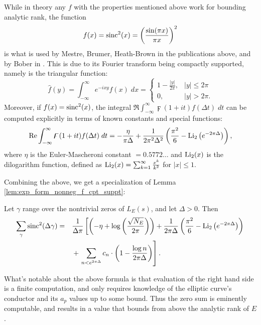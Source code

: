 While in theory any $f$ with the properties mentioned above work for bounding analytic rank, the function
\begin{equation}
f(x) = \operatorname{sinc}^2(x) = \left(\frac{\sin(\pi x)}{\pi x}\right)^2
\end{equation}
is what is used by Mestre, Brumer, Heath-Brown in the publications above, and by Bober in \cite{Bob-2011}. This is due to its Fourier transform being compactly supported, namely is the triangular function:
\begin{equation}
\hat{f}(y) = \int_{-\infty}^{\infty} e^{-i x y}f(x)\; dx =  \begin{cases} 1 - \frac{|y|}{2\pi}, & |y|\le 2\pi \\ 0, & |y| > 2\pi.\end{cases}
\end{equation}
Moreover, if $f(x) = \operatorname{sinc}^2(x)$, the integral $\Re\int_{-\infty}^{\infty} \digamma(1+it)f(\Delta t) \; dt$ can be computed explicitly in terms of known constants and special functions:
\begin{equation}
\mbox{\rm Re}\int_{-\infty}^{\infty} \digamma(1+it)f(\Delta t) \; dt = - \frac{\eta}{\pi \Delta} + \frac{1}{2\pi^2 \Delta^2}\left(\frac{\pi^2}{6} - \operatorname{Li}_2\left(e^{-2\pi \Delta}\right)\right),
\end{equation}
where $\eta$ is the Euler-Mascheroni constant $= 0.5772\ldots$ and $\operatorname{Li}_2(x)$ is the dilogarithm function, defined as $\operatorname{Li}_2(x) = \sum_{k=1}^{\infty} \frac{x^k}{k^2}$ for $|x|\le 1$.

Combining the above, we get a specialization of Lemma \ref{lem:exp_form_nonneg_f_cpt_suppt}:
\begin{corollary}[GRH]
Let $\gamma$ range over the nontrivial zeros of $L_E(s)$, and let $\Delta > 0$. Then
\begin{align}\label{eqn:sincsquared_sum}
\sum_{\gamma} \operatorname{sinc}^2(\Delta \gamma) = \quad &\frac{1}{\Delta \pi}\left[\left(-\eta + \log\left(\frac{\sqrt{N_E}}{2\pi}\right)\right)+ \frac{1}{2\pi \Delta}\left(\frac{\pi^2}{6} - \operatorname{Li}_2\left(e^{-2\pi \Delta}\right)\right)  \right. \nonumber \\
&+ \left.\sum_{n<e^{2\pi \Delta}} c_n \cdot \left(1-\frac{\log n}{2\pi \Delta}\right)\right].
\end{align}
\end{corollary}

What's notable about the above formula is that evaluation of the right hand side is a finite computation, and only requires knowledge of the elliptic curve's conductor and its $a_p$ values up to some bound. Thus the zero sum is eminently computable, and results in a value that bounds from above the analytic rank of $E$. \\

